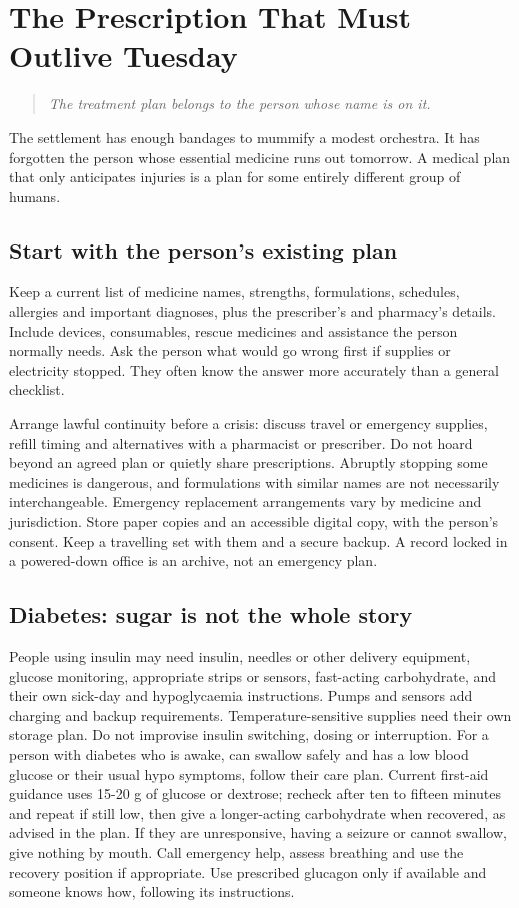 \documentclass[10pt,openright]{book}
\begin{document}
\chapter{The Prescription That Must Outlive Tuesday}
\begin{quote}\emph{The treatment plan belongs to the person whose name is on it.}\end{quote}
The settlement has enough bandages to mummify a modest orchestra. It has forgotten the person whose essential medicine runs out tomorrow. A medical plan that only anticipates injuries is a plan for some entirely different group of humans.

\section*{Start with the person's existing plan}
Keep a current list of medicine names, strengths, formulations, schedules, allergies and important diagnoses, plus the prescriber's and pharmacy's details. Include devices, consumables, rescue medicines and assistance the person normally needs. Ask the person what would go wrong first if supplies or electricity stopped. They often know the answer more accurately than a general checklist.

Arrange lawful continuity before a crisis: discuss travel or emergency supplies, refill timing and alternatives with a pharmacist or prescriber. Do not hoard beyond an agreed plan or quietly share prescriptions. Abruptly stopping some medicines is dangerous, and formulations with similar names are not necessarily interchangeable. Emergency replacement arrangements vary by medicine and jurisdiction. Store paper copies and an accessible digital copy, with the person's consent. Keep a travelling set with them and a secure backup. A record locked in a powered-down office is an archive, not an emergency plan.

\section*{Diabetes: sugar is not the whole story}
People using insulin may need insulin, needles or other delivery equipment, glucose monitoring, appropriate strips or sensors, fast-acting carbohydrate, and their own sick-day and hypoglycaemia instructions. Pumps and sensors add charging and backup requirements. Temperature-sensitive supplies need their own storage plan. Do not improvise insulin switching, dosing or interruption. For a person with diabetes who is awake, can swallow safely and has a low blood glucose or their usual hypo symptoms, follow their care plan. Current first-aid guidance uses 15-20 g of glucose or dextrose; recheck after ten to fifteen minutes and repeat if still low, then give a longer-acting carbohydrate when recovered, as advised in the plan. If they are unresponsive, having a seizure or cannot swallow, give nothing by mouth. Call emergency help, assess breathing and use the recovery position if appropriate. Use prescribed glucagon only if available and someone knows how, following its instructions.
\end{document}
